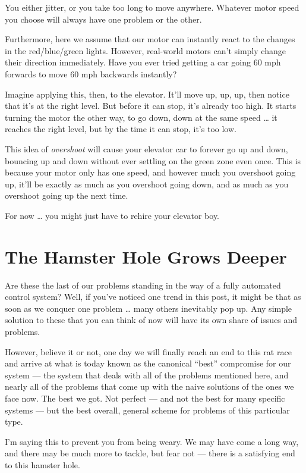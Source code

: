 \documentclass[]{article}
\begin{document}
You either jitter, or you take too long to move anywhere. Whatever motor speed
you choose will always have one problem or the other.

Furthermore, here we assume that our motor can instantly react to the changes in
the red/blue/green lights. However, real-world motors can't simply change their
direction immediately. Have you ever tried getting a car going 60 mph forwards
to move 60 mph backwards instantly?

Imagine applying this, then, to the elevator. It'll move up, up, up, then notice
that it's at the right level. But before it can stop, it's already too high. It
starts turning the motor the other way, to go down, down at the same speed
\ldots{} it reaches the right level, but by the time it can stop, it's too low.

This idea of \emph{overshoot} will cause your elevator car to forever go up and
down, bouncing up and down without ever settling on the green zone even once.
This is because your motor only has one speed, and however much you overshoot
going up, it'll be exactly as much as you overshoot going down, and as much as
you overshoot going up the next time.

For now \ldots{} you might just have to rehire your elevator boy.

\section{The Hamster Hole Grows Deeper}\label{the-hamster-hole-grows-deeper}

Are these the last of our problems standing in the way of a fully automated
control system? Well, if you've noticed one trend in this post, it might be that
as soon as we conquer one problem \ldots{} many others inevitably pop up. Any
simple solution to these that you can think of now will have its own share of
issues and problems.

However, believe it or not, one day we will finally reach an end to this rat
race and arrive at what is today known as the canonical ``best'' compromise for
our system --- the system that deals with all of the problems mentioned here,
and nearly all of the problems that come up with the naive solutions of the ones
we face now. The best we got. Not perfect --- and not the best for many specific
systems --- but the best overall, general scheme for problems of this particular
type.

I'm saying this to prevent you from being weary. We may have come a long way,
and there may be much more to tackle, but fear not --- there is a satisfying end
to this hamster hole.
\end{document}
